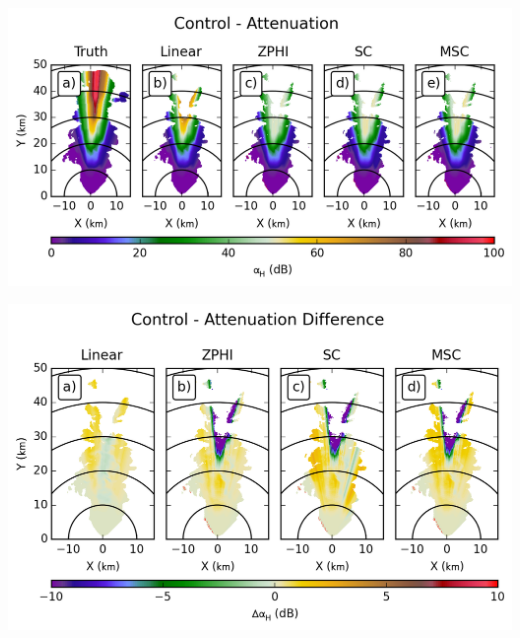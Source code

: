 \documentclass[red]{beamer}
\begin{document}
\begin{frame}
    \begin{center}
        \includegraphics[scale=0.7]{figures/X_Control_Attenuation_H}
    \end{center}
\end{frame}

\begin{frame}
    \begin{center}
        \includegraphics[scale=0.7]{figures/X_Control_Attenuation_Difference_H}
    \end{center}
\end{frame}
\end{document}
